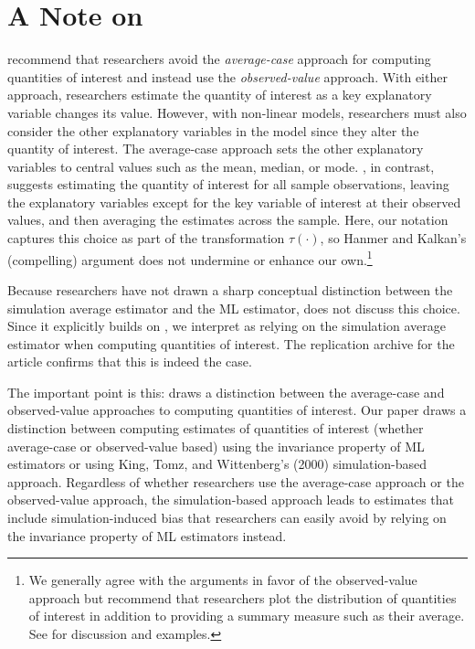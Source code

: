 \documentclass[11pt]{article}
\begin{document}
\section*{A Note on \cite{HanmerKalkan2013}}

\cite{HanmerKalkan2013} recommend that researchers avoid the {\it average-case} approach for computing quantities of interest and instead use the {\it observed-value} approach. With either approach, researchers estimate the quantity of interest as a key explanatory variable changes its value. However, with non-linear models, researchers must also consider the other explanatory variables in the model since they alter the quantity of interest. The average-case approach sets the other explanatory variables to central values such as the mean, median, or mode. \cite{HanmerKalkan2013}, in contrast, suggests estimating the quantity of interest for all sample observations, leaving the explanatory variables except for the key variable of interest at their observed values, and then averaging the estimates across the sample. Here, our notation captures this choice as part of the transformation $\tau(\cdot)$, so Hanmer and Kalkan's (compelling) argument does not undermine or enhance our own.\footnote{We generally agree with the arguments in favor of the observed-value approach but recommend that researchers plot the distribution of quantities of interest in addition to providing a summary measure such as their average. See \cite{AiNorton2003} for discussion and examples.}

Because researchers have not drawn a sharp conceptual distinction between the simulation average estimator and the ML estimator, \cite{HanmerKalkan2013} does not discuss this choice. Since it explicitly builds on \cite{KingTomzWittenberg2000}, we interpret \cite{HanmerKalkan2013} as relying on the simulation average estimator when computing quantities of interest. The replication archive for the article confirms that this is indeed the case.

The important point is this: \cite{HanmerKalkan2013} draws a distinction between the average-case and observed-value approaches to computing quantities of interest. Our paper draws a distinction between computing estimates of quantities of interest (whether average-case or observed-value based) using the invariance property of ML estimators or using King, Tomz, and Wittenberg's (2000) simulation-based approach. Regardless of whether researchers use the average-case approach or the observed-value approach, the simulation-based approach leads to estimates that include simulation-induced bias that researchers can easily avoid by relying on the invariance property of ML estimators instead.
\end{document}
